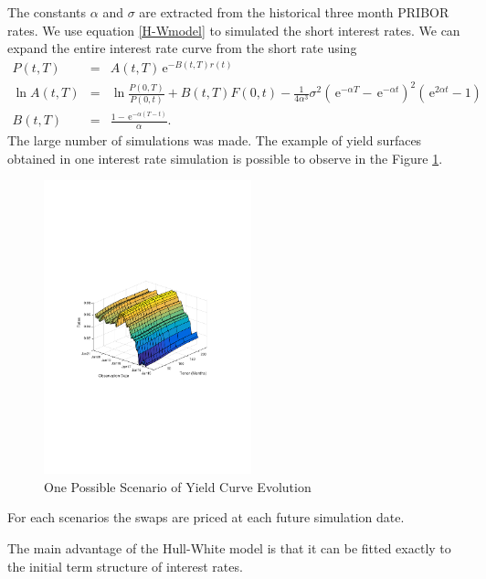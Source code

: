\documentclass{amsart}
\theoremstyle{definition}\newtheorem{definition}[theorem]{Definition}
\theoremstyle{remark}\newtheorem{remark}[theorem]{Remark}
\newcommand{\e}{\,\mathrm{e}}
\begin{document}
The constants $\alpha$ and $\sigma$ are extracted from the historical three month PRIBOR rates.
We use equation \eqref{H-Wmodel} to simulated the short interest rates.  
We can expand the entire interest rate curve from the short rate using
\begin{eqnarray}
P(t,T)&=&A(t,T)\e^{-B(t,T)r(t)}\\
\ln A(t,T)&=&\ln \frac{P(0,T)}{P(0,t)}+B(t,T)F(0,t)-\frac{1}{4\alpha^3}\sigma^2(\e^{-\alpha T}-\e^{-\alpha t})^2(\e^{2\alpha t}-1)  \nonumber\\
B(t,T)&=&\frac{1-\e^{-\alpha(T-t)}}{\alpha}.\nonumber
\end{eqnarray}
The large number of simulations was made. 
The example of yield surfaces obtained in one interest rate simulation is possible to observe in the Figure \ref{YieldCurveEvolution}.
\begin{figure}[!htbp]
  \centering 
	\includegraphics[width=6cm, clip, trim= 110 270 110 270]{IMG/YieldCurveEvolution.pdf}
  \caption{ One Possible Scenario of Yield Curve Evolution}  \label{YieldCurveEvolution}
\end{figure}
For each scenarios the swaps are priced at each future simulation date. 

The main advantage of the Hull-White model is that it can be fitted exactly to the initial term structure of interest rates.
\end{document}
